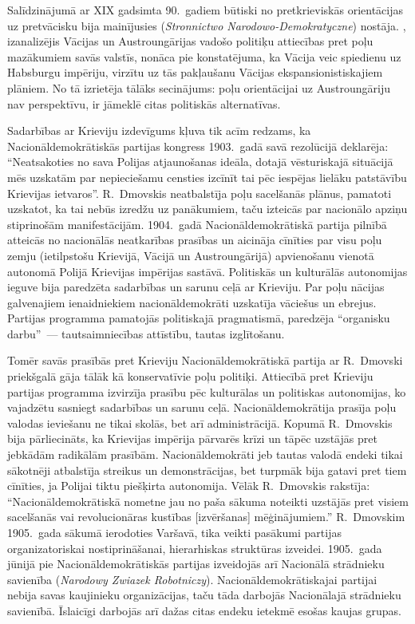 \documentclass[twoside,a5paper,12pt,fleqn,openany]{extbook}
\newcommand{\pltxti}[1]{\textit{\textpolish{#1}}}
\begin{document}
Salīdzinājumā ar XIX gadsimta 90.~gadiem būtiski no pretkrieviskās orientācijas uz pretvācisku bija mainījusies  (\pltxti{Stronnictwo Narodowo-Demokratyczne}) nostāja. , izanalizējis Vācijas un Austroungārijas vadošo politiķu attiecības pret poļu mazākumiem savās valstīs, nonāca pie konstatējuma, ka Vācija veic spiedienu uz Habsburgu impēriju, virzītu uz tās pakļaušanu Vācijas ekspansionistiskajiem plāniem. No tā izrietēja tālāks secinājums: poļu orientācijai uz Austroungāriju nav perspektīvu, ir jāmeklē citas politiskās alternatīvas.

Sadarbības ar Krieviju izdevīgums kļuva tik acīm redzams, ka Nacionāldemokrātiskās partijas kongress 1903.~gadā savā rezolūcijā deklarēja: ``Neatsakoties no sava Polijas atjaunošanas ideāla, dotajā vēsturiskajā situācijā mēs uzskatām par nepieciešamu censties izcīnīt tai pēc iespējas lielāku patstāvību Krievijas ietvaros''. R.~Dmovskis neatbalstīja poļu sacelšanās plānus, pamatoti uzskatot, ka tai nebūs izredžu uz panākumiem, taču izteicās par nacionālo apziņu stiprinošām manifestācijām. 1904.~gadā Nacionāldemokrātiskā partija pilnībā atteicās no nacionālās neatkarības prasības un aicināja cīnīties par visu poļu zemju (ietilpstošu Krievijā, Vācijā un Austroungārijā) apvienošanu vienotā autonomā Polijā Krievijas impērijas sastāvā. Politiskās un kulturālās autonomijas ieguve bija paredzēta sadarbības un sarunu ceļā ar Krieviju. Par poļu nācijas galvenajiem ienaidniekiem nacionāldemokrāti uzskatīja vāciešus un ebrejus. Partijas programma pamatojās politiskajā pragmatismā, paredzēja ``organisku darbu''~--- tautsaimniecības attīstību, tautas izglītošanu.

Tomēr savās prasībās pret Krieviju Nacionāldemokrātiskā partija ar R.~Dmovski priekšgalā gāja tālāk kā konservatīvie poļu politiķi. Attiecībā pret Krieviju partijas programma izvirzīja prasību pēc kulturālas un politiskas autonomijas, ko vajadzētu sasniegt sadarbības un sarunu ceļā. Nacionāldemokrātija prasīja poļu valodas ieviešanu ne tikai skolās, bet arī administrācijā. Kopumā R.~Dmovskis bija pārliecināts, ka Krievijas impērija pārvarēs krīzi un tāpēc uzstājās pret jebkādām radikālām prasībām. Nacionāldemokrāti jeb tautas valodā endeki tikai sākotnēji atbalstīja streikus un demonstrācijas, bet turpmāk bija gatavi pret tiem cīnīties, ja Polijai tiktu piešķirta autonomija. Vēlāk R.~Dmovskis rakstīja: ``Nacionāldemokrātiskā nometne jau no paša sākuma noteikti uzstājās pret visiem sacelšanās vai revolucionāras kustības [izvēršanas] mēģinājumiem.'' R.~Dmovskim 1905.~gada sākumā ierodoties Varšavā, tika veikti pasākumi partijas organizatoriskai nostiprināšanai, hierarhiskas struktūras izveidei. 1905.~gada jūnijā pie Nacionāldemokrātiskās partijas izveidojās arī Nacionālā strādnieku savienība (\pltxti{Narodowy Zwiazek Robotniczy}). Nacionāldemokrātiskajai partijai nebija savas kaujinieku organizācijas, taču tāda darbojās Nacionālajā strādnieku savienībā. Īslaicīgi darbojās arī dažas citas endeku ietekmē esošas kaujas grupas.
\end{document}
